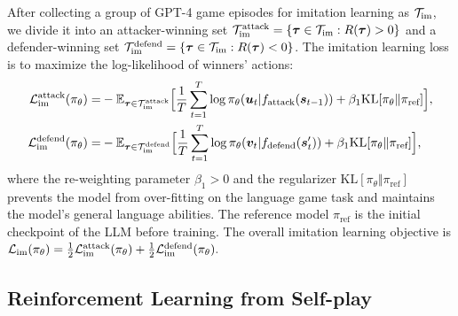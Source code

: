 \documentclass{article}
\theoremstyle{plain}
\theoremstyle{definition}
\theoremstyle{remark}
\begin{document}
After collecting a group of GPT-4 game episodes for imitation learning as ${\mathcal{T}}_\text{im}$, we 
divide it into an attacker-winning set ${\mathcal{T}}^\text{attack}_\text{im} = \{\bm{\tau} \in {\mathcal{T}}_\text{im}: R(\bm{\tau}) > 0\}$ and a defender-winning set ${\mathcal{T}}^\text{defend}_\text{im} = \{\bm{\tau} \in {\mathcal{T}}_\text{im} :R(\bm{\tau}) <0\}$. 
%
The imitation learning loss is to maximize the log-likelihood of winners' actions:
\begin{align}
    {\mathcal{L}}_\text{im}^\text{attack} (\pi_\theta)=& - \mathbb{E}_{\bm{\tau} \in {\mathcal{T}}^\text{attack}_\text{im}} \Big[
     \frac{1}{T} \sum_{t=1}^T \log \pi_\theta({\bm{u}}_t| f_\text{attack}({\bm{s}}_{t-1}))  + \beta_1 \text{KL}[\pi_\theta \Vert \pi_\text{ref}]\Big], \\
      {\mathcal{L}}_\text{im}^\text{defend} (\pi_\theta)=& - \mathbb{E}_{\bm{\tau} \in {\mathcal{T}}^\text{defend}_\text{im}} \Big[
     \frac{1}{T} \sum_{t=1}^T \log \pi_\theta({\bm{v}}_t| f_\text{defend}({\bm{s}}'_{t}))  + \beta_1 \text{KL}[\pi_\theta \Vert \pi_\text{ref}]\Big],
\end{align}
where the re-weighting parameter $\beta_1>0$ and the regularizer $\text{KL}[\pi_\theta \Vert \pi_\text{ref}]$ prevents the model from over-fitting on the language game task and maintains the model's general language abilities. The reference model $\pi_\text{ref}$ is the initial checkpoint of the LLM before training. 
%
The overall imitation learning objective is $
    {\mathcal{L}}_\text{im} (\pi_\theta)= \frac{1}{2}  {\mathcal{L}}_\text{im}^\text{attack}(\pi_\theta) + \frac{1}{2}  {\mathcal{L}}_\text{im}^\text{defend}(\pi_\theta).$
    

\vspace{-2mm}
\subsection{Reinforcement Learning from Self-play}
\vspace{-2mm}
\end{document}
